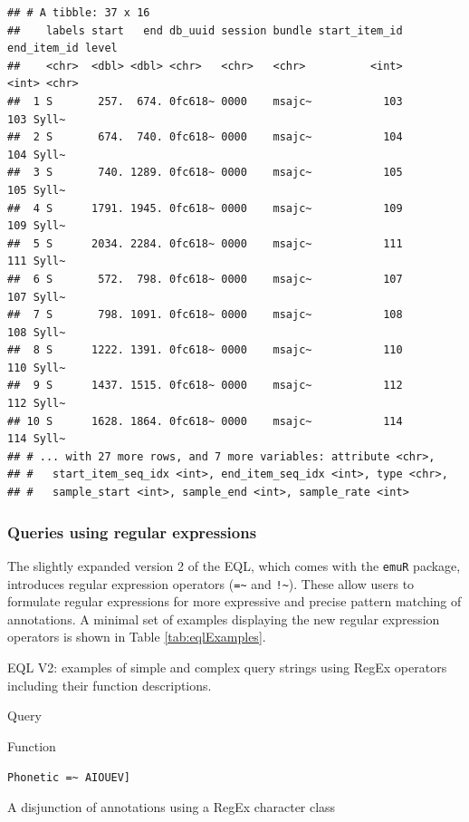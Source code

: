\documentclass[]{book}
\begin{document}
\begin{verbatim}
## # A tibble: 37 x 16
##    labels start   end db_uuid session bundle start_item_id end_item_id level
##    <chr>  <dbl> <dbl> <chr>   <chr>   <chr>          <int>       <int> <chr>
##  1 S       257.  674. 0fc618~ 0000    msajc~           103         103 Syll~
##  2 S       674.  740. 0fc618~ 0000    msajc~           104         104 Syll~
##  3 S       740. 1289. 0fc618~ 0000    msajc~           105         105 Syll~
##  4 S      1791. 1945. 0fc618~ 0000    msajc~           109         109 Syll~
##  5 S      2034. 2284. 0fc618~ 0000    msajc~           111         111 Syll~
##  6 S       572.  798. 0fc618~ 0000    msajc~           107         107 Syll~
##  7 S       798. 1091. 0fc618~ 0000    msajc~           108         108 Syll~
##  8 S      1222. 1391. 0fc618~ 0000    msajc~           110         110 Syll~
##  9 S      1437. 1515. 0fc618~ 0000    msajc~           112         112 Syll~
## 10 S      1628. 1864. 0fc618~ 0000    msajc~           114         114 Syll~
## # ... with 27 more rows, and 7 more variables: attribute <chr>,
## #   start_item_seq_idx <int>, end_item_seq_idx <int>, type <chr>,
## #   sample_start <int>, sample_end <int>, sample_rate <int>
\end{verbatim}

\hypertarget{queries-using-regular-expressions}{%
\subsubsection{Queries using regular expressions}\label{queries-using-regular-expressions}}

The slightly expanded version 2 of the EQL, which comes with the \texttt{emuR} package, introduces regular expression operators (\texttt{=\textasciitilde{}} and \texttt{!\textasciitilde{}}). These allow users to formulate regular expressions for more expressive and precise pattern matching of annotations. A minimal set of examples displaying the new regular expression operators is shown in Table \ref{tab:eqlExamples}.

\label{tab:eqlExamples}EQL V2: examples of simple and complex query strings using RegEx operators including their function descriptions.

Query

Function

\texttt{Phonetic\ =\textasciitilde{}\ \textquotesingle{}{[}AIOUEV{]}\textquotesingle{}}

A disjunction of annotations using a RegEx character class
\end{document}
